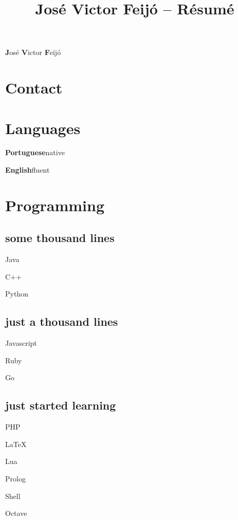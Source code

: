 \documentclass{article}
\def\emcolor{blue!25!black}
\newcommand{\fgem}{\color{\emcolor}}%
\newcommand{\contactentry}[2]{%
	\parbox{\textwidth}{\hfill #2 \hspace{1em}\null}
}
\newcommand{\languageentry}[2]{%
	\parbox{\textwidth}{\hfill \textbf{#1}\hspace{1em}#2\hspace{1em}\null}
}
\newenvironment{aside}{%
\noindent
\begin{minipage}[t]{\dimexpr0.25\textwidth}%
\let\oldsection\section
\let\oldsubsection\subsection
\renewcommand{\section}[1]{\oldsection*{\fgem ##1}}
\renewcommand{\subsection}[1]{\oldsubsection*{\small ##1}\vspace{-0.5em}}
\begin{center}%
}{%
\end{center}%
\let\subsection\oldsubsection
\let\section\oldsection
\end{minipage}%
}
\begin{document}
 \selectfont

\title{José Victor Feijó -- Résumé}

\hfill \Huge \textbf{J}osé \textbf{V}ictor \textbf{F}eijó
\normalsize \par
\vspace{\fill}

\begin{aside}
\section{Contact}


\section{Languages}
\languageentry{Portuguese}{native}
\languageentry{English}{fluent}


\section{Programming}
\subsection{some thousand lines}
\begin{itemize*}
\item{Java}
\item{C++}
\item{Python}
\end{itemize*}

\subsection{just a thousand lines}
\begin{itemize*}
\item{Javascript}
\item{Ruby}
\item{Go}
\end{itemize*}

\subsection{just started learning}
\begin{itemize*}
\item{PHP}
\item{\LaTeX}
\item{Lua}
\item{Prolog}
\item{Shell}
\item{Octave}
\end{itemize*}



\end{aside}
\end{document}
